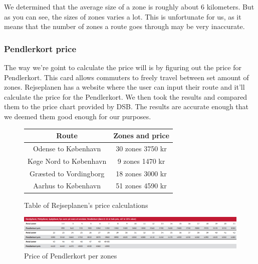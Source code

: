 We determined that the average size of a zone is roughly about 6 kilometers.
But as you can see, the sizes of zones varies a lot.
This is unfortunate for us, as it means that the number of zones a route goes through may be very inaccurate.

\subsubsection{Pendlerkort price}

The way we're goint to calculate the price will is by figuring out the price for Pendlerkort.
This card allows commuters to freely travel between set amount of zones.
Rejseplanen has a website where the user can input their route and it'll calculate the price for the Pendlerkort. %
We then took the results and compared them to the price chart provided by DSB. %
The results are accurate enough that we deemed them good enough for our purposes.

\begin{figure}[H]
    \centering
    \noindent
    \begin{tabular}{ || c | c || }
        \hline
        Route & Zones and price \\
        \hline\hline
        Odense to København & 30 zones 3750 kr \\
        \hline
        Køge Nord to København & 9 zones 1470 kr \\
        \hline
        Græsted to Vordingborg & 18 zones 3000 kr \\
        \hline
        Aarhus to København & 51 zones 4590 kr \\
        \hline
    \end{tabular}
    \caption{Table of Rejseplanen's price calculations}
\end{figure}

\begin{figure}[H]
    \centering
    \includegraphics[width=1\textwidth]{images/dsb-pendlerkort-pris.jpg}
    \caption{Price of Pendlerkort per zones}
\end{figure}

